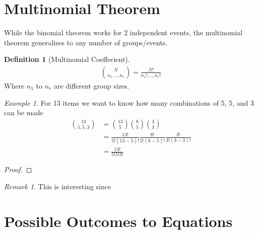 \documentclass{article}
\theoremstyle{plain}
\theoremstyle{definition}
\newtheorem{definition}{Definition}
\theoremstyle{remark}
\newtheorem{remark}{Remark}
\newtheorem{example}{Example}
\begin{document}

\section{Multinomial Theorem}
While the binomial theorem works for 2 independent events, the multinomial theorem generalizes to any number of groups/events.
\begin{definition}[Multinomial Coeffecient]
  \begin{align*}
    \binom{N}{n_1,..,n_r} = \frac{N!}{n_1!,..,n_r!}
  \end{align*}
  Where $n_1$ to $n_r$ are different group sizes.
\end{definition}

\begin{example}
  For 13 items we want to know how many combinations of 5, 5, and 3 can be made
  \begin{align*}
    \binom{13}{5,5,3} &= \binom{13}{5}\binom{8}{5}\binom{3}{3} \\
                      &= \frac{13!}{5!(13-5)!}\frac{8!}{5!(8-5)!}\frac{3!}{3!(3-3)!} \\
                      &=\frac{13!}{5!5!3!}
  \end{align*}
\end{example}

\begin{proof}
\end{proof}

\begin{remark}
	This is interesting since\textellipsis
\end{remark}

\section{Possible Outcomes to Equations}
\end{document}
